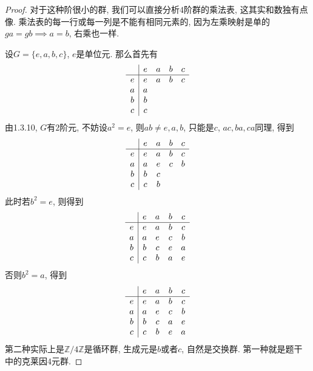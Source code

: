 \documentclass{../solutions-cn}
\begin{document}
\begin{proof}
    对于这种阶很小的群, 我们可以直接分析$4$阶群的乘法表, 这其实和数独有点像. 乘法表的每一行或每一列是不能有相同元素的, 因为左乘映射是单的$ga = gb \implies a = b$, 右乘也一样.

    设$G = \{e, a, b, c\}$, $e$是单位元. 那么首先有
    \[
    \begin{array}{c|c c c c}
      & e & a & b & c \\
    \hline
    e & e & a & b & c \\
    a & a &  &  &  \\
    b & b &  &  &  \\
    c & c &  &  &  \\
    \end{array}
    \]
    由1.3.10, $G$有$2$阶元, 不妨设$a^2 = e$, 则$ab \neq e, a, b$, 只能是$c$, $ac, ba, ca$同理, 得到
    \[
    \begin{array}{c|c c c c}
      & e & a & b & c \\
    \hline
    e & e & a & b & c \\
    a & a & e & c & b \\
    b & b & c &  &  \\
    c & c & b &  &  \\
    \end{array}
    \]
    此时若$b^2 = e$, 则得到
    \[
    \begin{array}{c|c c c c}
      & e & a & b & c \\
    \hline
    e & e & a & b & c \\
    a & a & e & c & b \\
    b & b & c & e & a \\
    c & c & b & a & e\\
    \end{array}
    \]
    否则$b^2 = a$, 得到
    \[
    \begin{array}{c|c c c c}
      & e & a & b & c \\
    \hline
    e & e & a & b & c \\
    a & a & e & c & b \\
    b & b & c & a & e \\
    c & c & b & e & a\\
    \end{array}
    \]
    第二种实际上是$\mathbb{Z}/4\mathbb{Z}$是循环群, 生成元是$b$或者$c$, 自然是交换群. 第一种就是题干中的克莱因$4$元群.
\end{proof}
\end{document}
